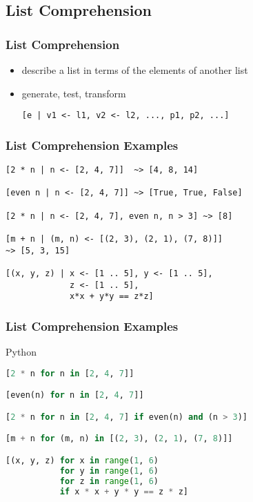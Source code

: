 \documentclass[dvipsnames]{beamer}
\theoremstyle{plain}
\begin{document}
\subsection{List Comprehension}

\begin{frame}[fragile]
  \frametitle{List Comprehension}

  \begin{itemize}
    \item describe a list in terms of the elements of another list
    \item generate, test, transform
    \begin{lstlisting}[style=syntax]
[e | v1 <- l1, v2 <- l2, ..., p1, p2, ...]
    \end{lstlisting}
  \end{itemize}
\end{frame}

\begin{frame}[fragile]
  \frametitle{List Comprehension Examples}

  \begin{exampleblock}{}
    \begin{lstlisting}
[2 * n | n <- [2, 4, 7]]  ~> [4, 8, 14]

[even n | n <- [2, 4, 7]] ~> [True, True, False]

[2 * n | n <- [2, 4, 7], even n, n > 3] ~> [8]

[m + n | (m, n) <- [(2, 3), (2, 1), (7, 8)]]
~> [5, 3, 15]

[(x, y, z) | x <- [1 .. 5], y <- [1 .. 5],
             z <- [1 .. 5],
             x*x + y*y == z*z]
    \end{lstlisting}
  \end{exampleblock}
\end{frame}

\begin{frame}[fragile]
  \frametitle{List Comprehension Examples}

  \begin{exampleblock}{Python}
    \begin{lstlisting}[language=Python]
[2 * n for n in [2, 4, 7]]

[even(n) for n in [2, 4, 7]]

[2 * n for n in [2, 4, 7] if even(n) and (n > 3)]

[m + n for (m, n) in [(2, 3), (2, 1), (7, 8)]]

[(x, y, z) for x in range(1, 6)
           for y in range(1, 6)
           for z in range(1, 6)
           if x * x + y * y == z * z]
    \end{lstlisting}
  \end{exampleblock}
\end{frame}
\end{document}
